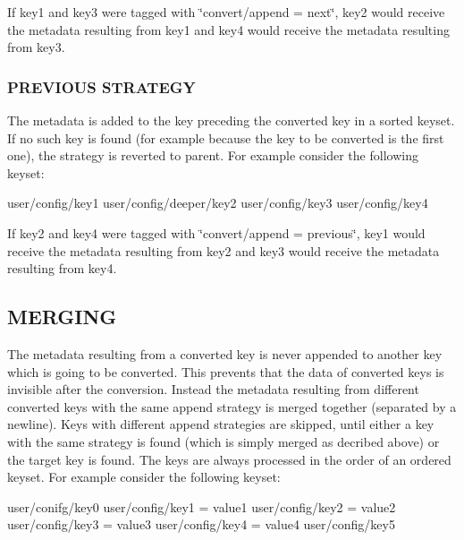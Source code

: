 If key1 and key3 were tagged with \char`\"{}convert/append = next\char`\"{}, key2 would receive the metadata resulting from key1 and key4 would receive the metadata resulting from key3.

\subsubsection*{P\+R\+E\+V\+I\+O\+U\+S S\+T\+R\+A\+T\+E\+G\+Y}

The metadata is added to the key preceding the converted key in a sorted keyset. If no such key is found (for example because the key to be converted is the first one), the strategy is reverted to parent. For example consider the following keyset\+: \begin{DoxyVerb}                            user/config/key1
                            user/config/deeper/key2
                            user/config/key3
                            user/config/key4
\end{DoxyVerb}


If key2 and key4 were tagged with \char`\"{}convert/append = previous\char`\"{}, key1 would receive the metadata resulting from key2 and key3 would receive the metadata resulting from key4.

\subsection*{M\+E\+R\+G\+I\+N\+G}

The metadata resulting from a converted key is never appended to another key which is going to be converted. This prevents that the data of converted keys is invisible after the conversion. Instead the metadata resulting from different converted keys with the same append strategy is merged together (separated by a newline). Keys with different append strategies are skipped, until either a key with the same strategy is found (which is simply merged as decribed above) or the target key is found. The keys are always processed in the order of an ordered keyset. For example consider the following keyset\+: \begin{DoxyVerb}                            user/conifg/key0
                            user/config/key1 = value1
                            user/config/key2 = value2
                            user/config/key3 = value3
                            user/config/key4 = value4
                            user/config/key5
\end{DoxyVerb}


